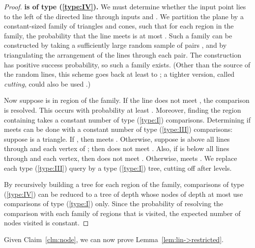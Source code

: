 \documentclass[letterpaper,11pt]{article}
\begin{document}
\begin{proof}
\noindent\textbf{ is of type (\ref{type:IV}).} 
We must determine whether the 
input point  lies to the 
left of the directed line 
through inputs  and .
We partition the plane by a 
constant-sized family of triangles 
and cones, such that for each
region  in the family, the 
probability that the line 
 meets  is at 
most . Such a family can 
be constructed by taking a 
sufficiently large random sample 
of pairs , 
and by triangulating the arrangement 
of the lines through each pair. The
construction has positive success 
probability, so such a family exists. 
(Other than the source of the random 
lines, this 
scheme goes back at least to \cite{Clarkson87}; 
a tighter version, called \emph{cutting}, 
could also be used \cite{Chazelle93}.) 
 
Now suppose  is in region  of 
the family. If the line  
does not meet , the comparison
is resolved. This occurs with probability 
at least . Moreover, finding the 
region containing  takes a 
constant number of type (\ref{type:I})
comparisons.  Determining
if  meets  can be done 
with a constant number of
type (\ref{type:III}) comparisons: 
suppose  is a triangle. 
If , then  
meets . Otherwise, suppose  
is above all lines through  and each
vertex of ; then  does not 
meet . Also, if 
is below all lines through  and 
each vertex, then 
does not meet . Otherwise,  
meets . We replace each type (\ref{type:III})
query by a type (\ref{type:I})
tree, cutting off after  levels.
 
By recursively building a tree for each
region  of the family, comparisons of 
type (\ref{type:IV}) can be reduced to
a tree of depth 
whose nodes of depth at most  
use comparisons of 
type (\ref{type:I}) only. Since 
the probability of 
resolving the comparison 
with each family of regions that 
is visited, the expected
number of nodes visited is constant.
\end{proof}

Given Claim~\ref{clm:node}, we can 
now prove Lemma~\ref{lem:lin->restricted}.
\end{document}
